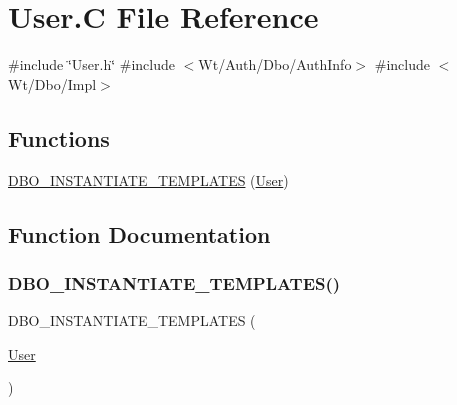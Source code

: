 \hypertarget{_user_8_c}{}\section{User.\+C File Reference}
\label{_user_8_c}
{\ttfamily \#include \char`\"{}User.\+h\char`\"{}}\newline
{\ttfamily \#include $<$Wt/\+Auth/\+Dbo/\+Auth\+Info$>$}\newline
{\ttfamily \#include $<$Wt/\+Dbo/\+Impl$>$}\newline
\subsection*{Functions}
\begin{DoxyCompactItemize}
\item 
\hyperlink{_user_8_c_a5e9e28133d45d8f717f048457e315261}{D\+B\+O\+\_\+\+I\+N\+S\+T\+A\+N\+T\+I\+A\+T\+E\+\_\+\+T\+E\+M\+P\+L\+A\+T\+ES} (\hyperlink{class_user}{User})
\end{DoxyCompactItemize}


\subsection{Function Documentation}
\mbox{\label{_user_8_c_a5e9e28133d45d8f717f048457e315261}} 
\subsubsection{\texorpdfstring{D\+B\+O\+\_\+\+I\+N\+S\+T\+A\+N\+T\+I\+A\+T\+E\+\_\+\+T\+E\+M\+P\+L\+A\+T\+E\+S()}{DBO\_INSTANTIATE\_TEMPLATES()}}
{\footnotesize\ttfamily D\+B\+O\+\_\+\+I\+N\+S\+T\+A\+N\+T\+I\+A\+T\+E\+\_\+\+T\+E\+M\+P\+L\+A\+T\+ES (\begin{DoxyParamCaption}\item[{\hyperlink{class_user}{User}}]{ }\end{DoxyParamCaption})}

